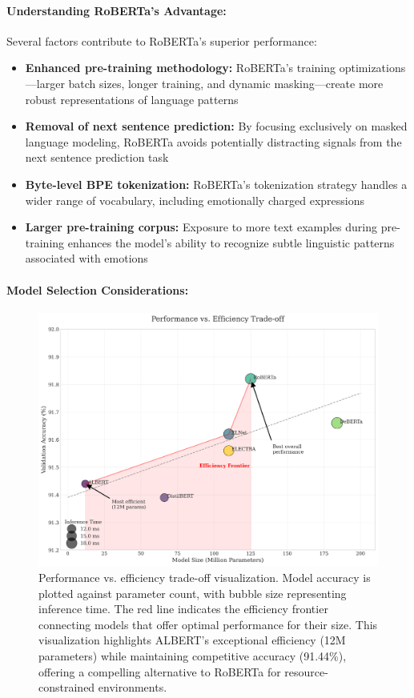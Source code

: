 \documentclass[12pt]{article}
\begin{document}
\paragraph{Understanding RoBERTa's Advantage:}
Several factors contribute to RoBERTa's superior performance:
\begin{itemize}
    \item \textbf{Enhanced pre-training methodology:} RoBERTa's training optimizations—larger batch sizes, longer training, and dynamic masking—create more robust representations of language patterns
    
    \item \textbf{Removal of next sentence prediction:} By focusing exclusively on masked language modeling, RoBERTa avoids potentially distracting signals from the next sentence prediction task
    
    \item \textbf{Byte-level BPE tokenization:} RoBERTa's tokenization strategy handles a wider range of vocabulary, including emotionally charged expressions
    
    \item \textbf{Larger pre-training corpus:} Exposure to more text examples during pre-training enhances the model's ability to recognize subtle linguistic patterns associated with emotions
\end{itemize}

\paragraph{Model Selection Considerations:}
\begin{figure}[h]
    \centering
    \includegraphics[width=0.9\linewidth]{Figures/performance_efficiency_tradeoff.png}
    \caption{Performance vs. efficiency trade-off visualization. Model accuracy is plotted against parameter count, with bubble size representing inference time. The red line indicates the efficiency frontier connecting models that offer optimal performance for their size. This visualization highlights ALBERT's exceptional efficiency (12M parameters) while maintaining competitive accuracy (91.44\%), offering a compelling alternative to RoBERTa for resource-constrained environments.}
    \label{fig:efficiency_tradeoff}
\end{figure}
\end{document}
